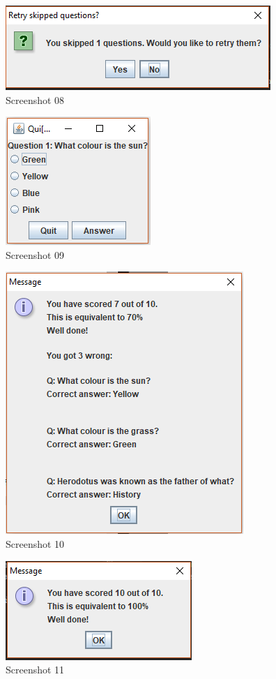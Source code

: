 \documentclass{report}
\begin{document}
    \begin{figure}
    	\centering
    	\includegraphics{Screenshot08}
    	\caption{Screenshot 08}
    	\label{fig:screenshot08}
    \end{figure}
    
    \begin{figure}
    	\centering
    	\includegraphics{Screenshot09}
    	\caption{Screenshot 09}
    	\label{fig:screenshot09}
    \end{figure}
    
    \begin{figure}
    	\centering
    	\includegraphics{Screenshot10}
    	\caption{Screenshot 10}
    	\label{fig:screenshot10}
    \end{figure}
    
    \begin{figure}
    	\centering
    	\includegraphics{Screenshot11}
    	\caption{Screenshot 11}
    	\label{fig:screenshot11}
    \end{figure}
    
\end{document}
